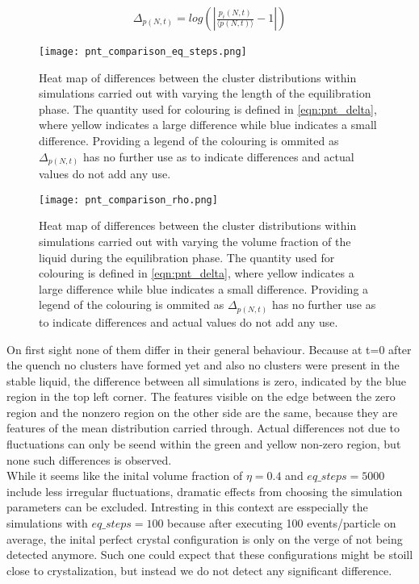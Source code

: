 \begin{align}
\label{eqn:pnt_delta}
\Delta_{p(N,t)} = log ( | \frac{p_i(N,t)}{\langle p(N,t) \rangle} -1 | )
\end{align}

\begin{figure}[h!]
\centering
\texttt{[image: pnt\_comparison\_eq\_steps.png]}
\caption{Heat map of differences between the cluster distributions within simulations carried out with varying the length of the equilibration phase. The quantity used for colouring is defined in \autoref{eqn:pnt_delta}, where yellow indicates a large difference while blue indicates a small difference. Providing a legend of the colouring is ommited as $\Delta_{p(N,t)}$ has no further use as to indicate differences and actual values do not add any use.}
\label{fig:pnt_eq_step_comparison}
\end{figure}


\begin{figure}[h!]
\centering
\texttt{[image: pnt\_comparison\_rho.png]}
\caption{Heat map of differences between the cluster distributions within simulations carried out with varying the volume fraction of the liquid during the equilibration phase. The quantity used for colouring is defined in \autoref{eqn:pnt_delta}, where yellow indicates a large difference while blue indicates a small difference. Providing a legend of the colouring is ommited as $\Delta_{p(N,t)}$ has no further use as to indicate differences and actual values do not add any use.}
\label{fig:pnt_rho_comparison}
\end{figure}

On first sight none of them differ in their general behaviour. Because at t=0 after the quench no clusters have formed yet and also no clusters were present in the stable liquid, the difference between all simulations is zero, indicated by the blue region in the top left corner. The features visible on the edge between the zero region and the nonzero region on the other side are the same, because they are features of the mean distribution carried through. Actual differences not due to fluctuations can only be seend within the green and yellow non-zero region, but none such differences is observed.\\

While it seems like the inital volume fraction of $\eta=0.4$ and $eq\_steps = 5000$ include less irregular fluctuations, dramatic effects from choosing the simulation parameters can be excluded. Intresting in this context are esspecially the simulations with $eq\_steps = 100$ because after executing 100 events/particle on average, the inital perfect crystal configuration is only on the verge of not being detected anymore. Such one could expect that these configurations might be stoill close to crystalization, but instead we do not detect any significant difference.\\

